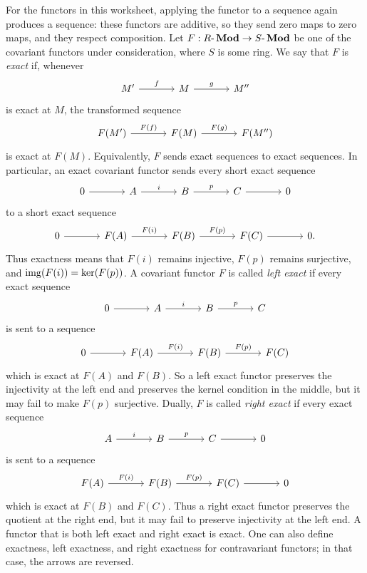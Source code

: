 \documentclass[Notebook.tex]{subfiles}
\begin{document}
For the functors in this worksheet, applying the functor to a sequence again produces a sequence: these functors are additive, so they send zero maps to zero maps, and they respect composition. Let $F:R\text{-}\operatorname{\textbf{Mod}}\to S\text{-}\operatorname{\textbf{Mod}}$ be one of the covariant functors under consideration, where $S$ is some ring. We say that $F$ is \emph{exact} if, whenever
\[
\begin{tikzcd}[column sep=large]
M' \arrow[r, "f"] & M \arrow[r, "g"] & M''
\end{tikzcd}
\]
is exact at $M$, the transformed sequence
\[
\begin{tikzcd}[column sep=large]
F(M') \arrow[r, "F(f)"] & F(M) \arrow[r, "F(g)"] & F(M'')
\end{tikzcd}
\]
is exact at $F(M)$. Equivalently, $F$ sends exact sequences to exact sequences. In particular, an exact covariant functor sends every short exact sequence
\[
\begin{tikzcd}[column sep=large]
0 \arrow[r] & A \arrow[r, "i"] & B \arrow[r, "p"] & C \arrow[r] & 0
\end{tikzcd}
\]
to a short exact sequence
\[
\begin{tikzcd}[column sep=large]
0 \arrow[r] & F(A) \arrow[r, "F(i)"] & F(B) \arrow[r, "F(p)"] & F(C) \arrow[r] & 0.
\end{tikzcd}
\]
Thus exactness means that $F(i)$ remains injective, $F(p)$ remains surjective, and $\operatorname{img}(F(i))=\ker(F(p))$. A covariant functor $F$ is called \emph{left exact} if every exact sequence
\[
\begin{tikzcd}[column sep=large]
0 \arrow[r] & A \arrow[r, "i"] & B \arrow[r, "p"] & C
\end{tikzcd}
\]
is sent to a sequence
\[
\begin{tikzcd}[column sep=large]
0 \arrow[r] & F(A) \arrow[r, "F(i)"] & F(B) \arrow[r, "F(p)"] & F(C)
\end{tikzcd}
\]
which is exact at $F(A)$ and $F(B)$. So a left exact functor preserves the injectivity at the left end and preserves the kernel condition in the middle, but it may fail to make $F(p)$ surjective. Dually, $F$ is called \emph{right exact} if every exact sequence
\[
\begin{tikzcd}[column sep=large]
A \arrow[r, "i"] & B \arrow[r, "p"] & C \arrow[r] & 0
\end{tikzcd}
\]
is sent to a sequence
\[
\begin{tikzcd}[column sep=large]
F(A) \arrow[r, "F(i)"] & F(B) \arrow[r, "F(p)"] & F(C) \arrow[r] & 0
\end{tikzcd}
\]
which is exact at $F(B)$ and $F(C)$. Thus a right exact functor preserves the quotient at the right end, but it may fail to preserve injectivity at the left end. A functor that is both left exact and right exact is exact. One can also define exactness, left exactness, and right exactness for contravariant functors; in that case, the arrows are reversed.
\end{document}
